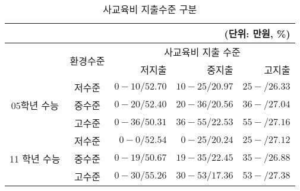 \begin{table}
\centering
\caption{사교육비 지출수준 구분}
\label{tab:knk_tutorexp}
    \begin{tabular}{c|c|rrr}
    \multicolumn{5}{r}{(단위: 만원, \%)} \\
    \hline \multirow{2}{*}{} & \multirow{2}{*}{ 환경수준 } & \multicolumn{3}{|c}{ 사교육비 지출 수준 } \\
    \cline { 3 - 5 } & & 저지출 & 중지출 & 고지출 \\
    \hline \multirow{3}{*}{ 05학년 수능 } & 저수준 & $0-10 / 52.70$ & $10-25 / 20.97$ & $25-/ 26.33$ \\
    & 중수준 & $0-20 / 52.40$ & $20-36 / 20.56$ & $36-/ 27.04$ \\
    & 고수준 & $0-36 / 50.31$ & $36-55 / 22.53$ & $55-/ 27.16$ \\
    \hline \multirow{3}{*}{11 학년 수능 } & 저수준 & $0-0 / 52.54$ & $0-25 / 20.24$ & $25-/ 27.12$ \\
    & 중수준 & $0-19 / 50.67$ & $19-35 / 22.45$ & $35-/ 26.88$ \\
    & 고수준 & $0-30 / 55.26$ & $30-53 / 17.36$ & $53-/ 27.38$ \\
    \hline
    \end{tabular}
\end{table}